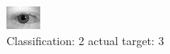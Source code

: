 \begin{figure}[h!]
\begin{center}
\includegraphics[width=0.60\columnwidth]{figures/ID531_class_2_target_3.png}
\end{center}
\caption{ Classification: 2 actual target: 3}
\label{fig:ID531_class_2_target_3}
\end{figure}
